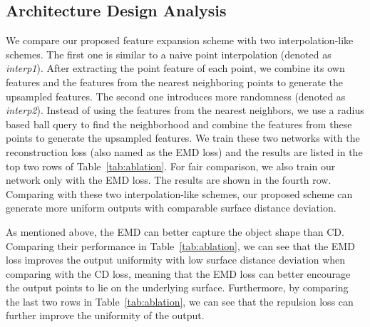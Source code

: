 \subsection{Architecture Design Analysis}
\label{sec:archtanalysis}

We compare our proposed feature expansion scheme with two interpolation-like schemes.  
The first one is similar to a naive point interpolation (denoted as \emph{interp1}). 
After extracting the point feature of each point, we combine its own features and the features from the nearest neighboring points to generate the upsampled features. 
The second one introduces more randomness (denoted as \emph{interp2}). 
Instead of using the features from the nearest neighbors, we use a radius based ball query to find the neighborhood and combine the features from these points to generate the upsampled features. 
We train these two networks with the reconstruction loss (also named as the EMD loss) and the results are listed in the top two rows of Table~\ref{tab:ablation}.
For fair comparison, we also train our network only with the EMD loss.
The results are shown in the fourth row.  
Comparing with these two interpolation-like schemes, our proposed scheme can generate more uniform outputs with comparable surface distance deviation.


As mentioned above, the EMD can better capture the object shape than CD.
Comparing their performance in Table~\ref{tab:ablation}, we can see that the EMD loss improves the output uniformity with low surface distance deviation when comparing with the CD loss, meaning that the EMD loss can better encourage the output points to lie on the underlying surface. 
Furthermore, by comparing the last two rows in Table~\ref{tab:ablation}, we can see that the repulsion loss can further improve the uniformity of the output. 

\begin{table}
	\centering
	\caption{Architecture design analysis on our collect dataset.}
	\label{tab:ablation}
	\vspace{-5.5mm}
\end{table}




